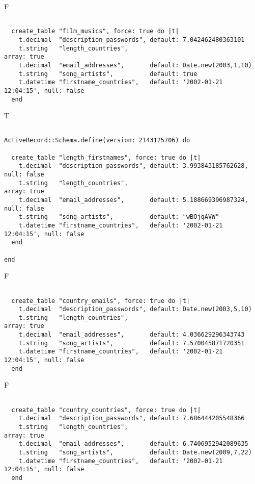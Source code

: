F
\begin{verbatim}

  create_table "film_musics", force: true do |t|
    t.decimal  "description_passwords", default: 7.042462480363101
    t.string   "length_countries",                                                   array: true
    t.decimal  "email_addresses",       default: Date.new(2003,1,10)
    t.string   "song_artists",          default: true
    t.datetime "firstname_countries",   default: '2002-01-21 12:04:15', null: false
  end

\end{verbatim}

T
\begin{verbatim}

ActiveRecord::Schema.define(version: 2143125706) do

  create_table "length_firstnames", force: true do |t|
    t.decimal  "description_passwords", default: 3.993843185762628,     null: false
    t.string   "length_countries",                                                   array: true
    t.decimal  "email_addresses",       default: 5.188669396987324,     null: false
    t.string   "song_artists",          default: "wBOjqAVW"
    t.datetime "firstname_countries",   default: '2002-01-21 12:04:15', null: false
  end

end
\end{verbatim}


F
\begin{verbatim}

  create_table "country_emails", force: true do |t|
    t.decimal  "description_passwords", default: Date.new(2003,5,10)
    t.string   "length_countries",                                                   array: true
    t.decimal  "email_addresses",       default: 4.036629296343743
    t.string   "song_artists",          default: 7.570045871720351
    t.datetime "firstname_countries",   default: '2002-01-21 12:04:15', null: false
  end

\end{verbatim}

F
\begin{verbatim}

  create_table "country_countries", force: true do |t|
    t.decimal  "description_passwords", default: 7.686444205548366
    t.string   "length_countries",                                                   array: true
    t.decimal  "email_addresses",       default: 6.7406952942089635
    t.string   "song_artists",          default: Date.new(2009,7,22)
    t.datetime "firstname_countries",   default: '2002-01-21 12:04:15', null: false
  end

\end{verbatim}

